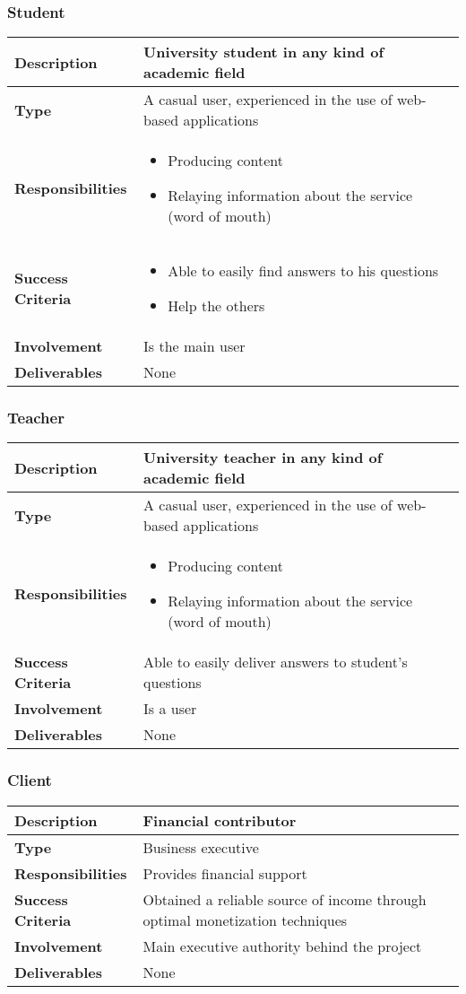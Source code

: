 \documentclass [a4paper, 12pt] {article}
\begin{document}
\subsubsection{Student}
\begin{tabular}{| >{\bfseries} M{4cm} | M{10cm} |}
	\hline
	Description & University student in any kind of academic field \tabularnewline
	\hline
	Type & A casual user, experienced in the use of web-based applications \tabularnewline
	\hline
	Responsibilities &
	\begin{itemize}
		\item Producing content
		\item Relaying information about the service (word of mouth)
	\end{itemize} \tabularnewline
	\hline
	Success Criteria &
	\begin{itemize}
		\item Able to easily find answers to his questions
		\item Help the others
	\end{itemize} \tabularnewline
	\hline
	Involvement & Is the main user \tabularnewline
	\hline
	Deliverables & None \tabularnewline
	\hline
\end{tabular}

\subsubsection{Teacher}
\begin{tabular}{| >{\bfseries} M{4cm} | M{10cm} |}
	\hline
	Description & University teacher in any kind of academic field \tabularnewline
	\hline
	Type & A casual user, experienced in the use of web-based applications \tabularnewline
	\hline
	Responsibilities &
	\begin{itemize}
		\item Producing content
		\item Relaying information about the service (word of mouth)
	\end{itemize} \tabularnewline
	\hline
	Success Criteria & Able to easily deliver answers to student's questions \tabularnewline
	\hline
	Involvement & Is a user \tabularnewline
	\hline
	Deliverables & None \tabularnewline
	\hline
\end{tabular}

\subsubsection{Client}
\begin{tabular}{| >{\bfseries} M{4cm} | M{10cm} |}
	\hline
	Description & Financial contributor \tabularnewline
	\hline
	Type & Business executive \tabularnewline
	\hline
	Responsibilities & Provides financial support \tabularnewline
	\hline
	Success Criteria & Obtained a reliable source of income through optimal monetization techniques \tabularnewline
	\hline
	Involvement & Main executive authority behind the project \tabularnewline
	\hline
	Deliverables & None \tabularnewline
	\hline
\end{tabular}
\end{document}
